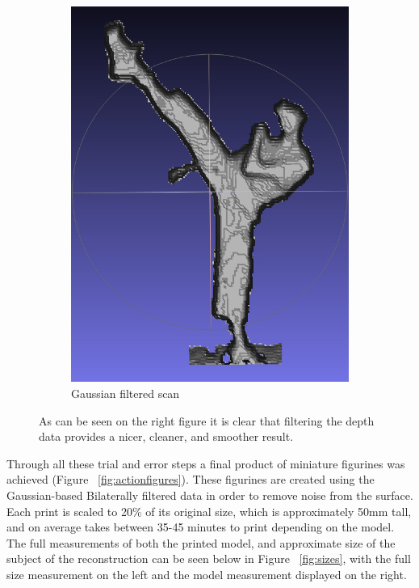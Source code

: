 \documentclass[pdftex,10.5pt]{report}
\begin{document}
\begin{figure}[H]
\begin{subfigure}[H]{0.4\textwidth}
		\includegraphics[width=\textwidth]{figures/filter}
		\caption{Gaussian filtered scan}
	\end{subfigure}
	\caption{As can be seen on the right figure it is clear that filtering the depth data provides 
		a nicer, cleaner, and smoother result.
	}
	\label{fig:filtering}
\end{figure}

Through all these trial and error steps a final product of miniature figurines was achieved (Figure ~\ref{fig:actionfigures}). These figurines are created using the Gaussian-based Bilaterally filtered data in order to remove noise from the surface. Each print is scaled to 20\% of its original size, which is approximately 50mm tall, and on average takes between 35-45 minutes to print depending on the model. The full measurements of both the printed model, and approximate size of the subject of the reconstruction can be seen below in Figure ~\ref{fig:sizes}, with the full size measurement on the left and the model measurement displayed on the right.
\end{document}
